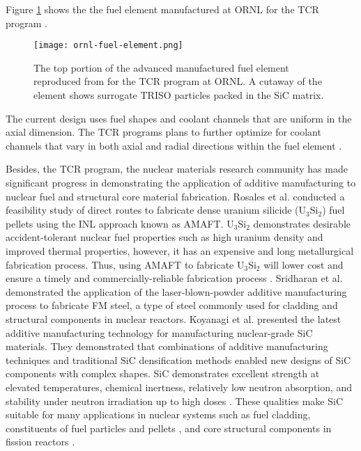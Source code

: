 Figure \ref{fig:ornl-fuel-element} shows the the fuel element manufactured at 
\gls{ORNL} for the \gls{TCR} program \cite{betzler_transformational_2020}. 
\begin{figure}[]
    \centering
    \texttt{[image: ornl-fuel-element.png]} 
    \caption{The top portion of the advanced manufactured fuel element 
    reproduced from \cite{betzler_transformational_2020} for the \acrfull{TCR} 
    program at \acrfull{ORNL}. A cutaway of the element shows surrogate TRISO 
    particles packed in the SiC matrix.}
    \label{fig:ornl-fuel-element}
\end{figure}
The current design uses fuel shapes and coolant channels that are uniform in the 
axial dimension. 
The \gls{TCR} programs plans to further optimize for coolant channels that vary 
in both axial and radial directions within the fuel element 
\cite{betzler_transformational_2020,sobes_artificial_2020}. 

Besides, the \gls{TCR} program, the nuclear materials research community has made 
significant progress in demonstrating the application of additive manufacturing 
to nuclear fuel and structural core material fabrication. 
Rosales et al. \cite{rosales_characterizing_2019} conducted a feasibility study 
of direct routes to fabricate dense uranium silicide (U$_3$Si$_2$) fuel pellets 
using the \gls{INL} approach known as \gls{AMAFT}. 
U$_3$Si$_2$ demonstrates desirable accident-tolerant nuclear fuel properties 
such as high uranium density and improved thermal properties, however, it has 
an expensive and long metallurgical fabrication process. 
Thus, using \gls{AMAFT} to fabricate U$_3$Si$_2$ will lower cost and ensure a
timely and commercially-reliable fabrication process \cite{rosales_characterizing_2019}. 
Sridharan et al. \cite{sridharan_performance_2019} demonstrated the application of
the laser-blown-powder additive manufacturing process to fabricate \gls{FM} steel, a type of 
steel commonly used for cladding and structural components in nuclear reactors. 
Koyanagi et al. \cite{koyanagi_additive_2020} presented the latest 
additive manufacturing technology for manufacturing nuclear-grade \gls{SiC} materials. 
They demonstrated that combinations of additive manufacturing techniques and 
traditional \gls{SiC} densification methods enabled new designs of \gls{SiC} 
components with complex shapes. 
\gls{SiC} demonstrates excellent strength at elevated temperatures, chemical inertness, 
relatively low neutron absorption, and stability under neutron irradiation up 
to high doses \cite{sauder_ceramic_2014, snead_handbook_2007,koyanagi_additive_2020}. 
These qualities make \gls{SiC} suitable for many applications in nuclear systems 
such as fuel cladding, constituents of fuel particles \cite{snead_handbook_2007} 
and pellets \cite{terrani_progress_2015}, and core structural components in fission 
reactors \cite{sauder_ceramic_2014}. 

